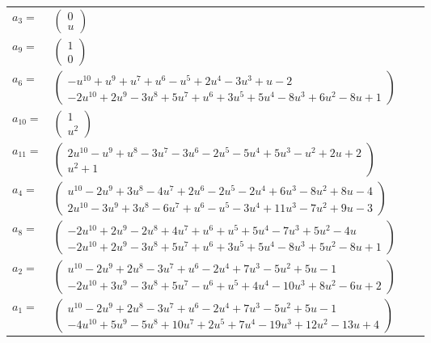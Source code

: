 \documentclass[1p]{elsarticle_modified}
\theoremstyle{definition}
\begin{document}
\begin{tabular}{m{7pt} m{180pt} m{7pt} m{180pt} }
\flushright $a_{3}=$&$\begin{pmatrix}0\\u\end{pmatrix}$ \\
\flushright $a_{9}=$&$\begin{pmatrix}1\\0\end{pmatrix}$ \\
\flushright $a_{6}=$&$\begin{pmatrix}- u^{10}+u^9+u^7+u^6- u^5+2 u^4-3 u^3+u-2\\-2 u^{10}+2 u^9-3 u^8+5 u^7+u^6+3 u^5+5 u^4-8 u^3+6 u^2-8 u+1\end{pmatrix}$ \\
\flushright $a_{10}=$&$\begin{pmatrix}1\\u^2\end{pmatrix}$ \\
\flushright $a_{11}=$&$\begin{pmatrix}2 u^{10}- u^9+u^8-3 u^7-3 u^6-2 u^5-5 u^4+5 u^3- u^2+2 u+2\\u^2+1\end{pmatrix}$ \\
\flushright $a_{4}=$&$\begin{pmatrix}u^{10}-2 u^9+3 u^8-4 u^7+2 u^6-2 u^5-2 u^4+6 u^3-8 u^2+8 u-4\\2 u^{10}-3 u^9+3 u^8-6 u^7+u^6- u^5-3 u^4+11 u^3-7 u^2+9 u-3\end{pmatrix}$ \\
\flushright $a_{8}=$&$\begin{pmatrix}-2 u^{10}+2 u^9-2 u^8+4 u^7+u^6+u^5+5 u^4-7 u^3+5 u^2-4 u\\-2 u^{10}+2 u^9-3 u^8+5 u^7+u^6+3 u^5+5 u^4-8 u^3+5 u^2-8 u+1\end{pmatrix}$ \\
\flushright $a_{2}=$&$\begin{pmatrix}u^{10}-2 u^9+2 u^8-3 u^7+u^6-2 u^4+7 u^3-5 u^2+5 u-1\\-2 u^{10}+3 u^9-3 u^8+5 u^7- u^6+u^5+4 u^4-10 u^3+8 u^2-6 u+2\end{pmatrix}$ \\
\flushright $a_{1}=$&$\begin{pmatrix}u^{10}-2 u^9+2 u^8-3 u^7+u^6-2 u^4+7 u^3-5 u^2+5 u-1\\-4 u^{10}+5 u^9-5 u^8+10 u^7+2 u^5+7 u^4-19 u^3+12 u^2-13 u+4\end{pmatrix}$ \\

\end{tabular}
\end{document}

